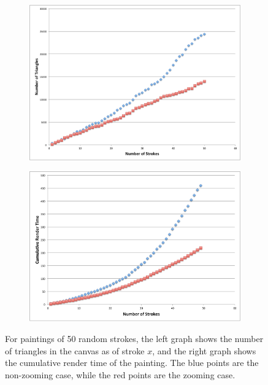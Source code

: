 \documentclass[review]{acmsiggraph}
\begin{document}
\begin{figure}
  \centering
  \begin{subfigure}[b]{0.5\columnwidth}
    \centering
    \includegraphics[width=\columnwidth]{graphs/numtriangles}
    \label{fig:numtriangles}
  \end{subfigure}%
  \begin{subfigure}[b]{0.5\columnwidth}
    \centering
    \includegraphics[width=\columnwidth]{graphs/cumulativetime}
    \label{fig:timing}
  \end{subfigure}%
  \vspace{-0.4cm}
  \caption{For paintings of 50 random strokes, the left graph shows the number of triangles in the canvas as of stroke $x$, and the right graph shows the cumulative render time of the painting. The blue points are the non-zooming case, while the red points are the zooming case.}
\end{figure}
\end{document}
